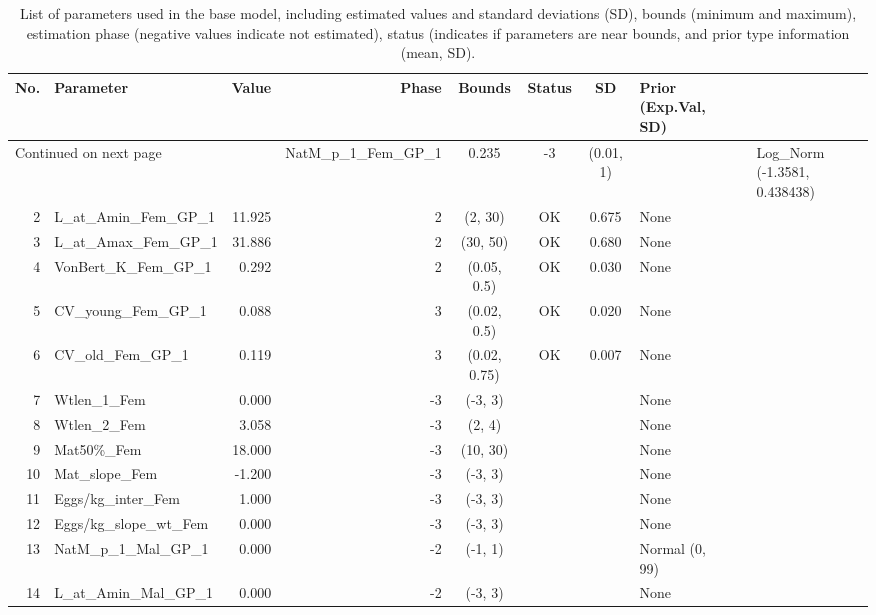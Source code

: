 \documentclass[12pt,]{article}
\begin{document}
\begin{landscape}
\begin{longtable}{rlrrcccl}
\caption{List of parameters used in
                                              the base model, including estimated 
                                              values and standard deviations (SD), 
                                              bounds (minimum and maximum), 
                                              estimation phase (negative values indicate
                                              not estimated), status (indicates if 
                                              parameters are near bounds, and prior type
                                              information (mean, SD).} \\ 
  \hline
No. & Parameter & Value & Phase & Bounds & Status & SD & Prior (Exp.Val, SD)  \\ 
  \hline 
\endhead 
\hline 
\multicolumn{3}{l}{\footnotesize Continued on next page} 
\endfoot 
\endlastfoot 
 \hline
1 & NatM\_p\_1\_Fem\_GP\_1 & 0.235 & -3 & (0.01, 1) &  &  & Log\_Norm (-1.3581, 0.438438) \\ 
  2 & L\_at\_Amin\_Fem\_GP\_1 & 11.925 & 2 & (2, 30) & OK & 0.675 & None \\ 
  3 & L\_at\_Amax\_Fem\_GP\_1 & 31.886 & 2 & (30, 50) & OK & 0.680 & None \\ 
  4 & VonBert\_K\_Fem\_GP\_1 & 0.292 & 2 & (0.05, 0.5) & OK & 0.030 & None \\ 
  5 & CV\_young\_Fem\_GP\_1 & 0.088 & 3 & (0.02, 0.5) & OK & 0.020 & None \\ 
  6 & CV\_old\_Fem\_GP\_1 & 0.119 & 3 & (0.02, 0.75) & OK & 0.007 & None \\ 
  7 & Wtlen\_1\_Fem & 0.000 & -3 & (-3, 3) &  &  & None \\ 
  8 & Wtlen\_2\_Fem & 3.058 & -3 & (2, 4) &  &  & None \\ 
  9 & Mat50\%\_Fem & 18.000 & -3 & (10, 30) &  &  & None \\ 
  10 & Mat\_slope\_Fem & -1.200 & -3 & (-3, 3) &  &  & None \\ 
  11 & Eggs/kg\_inter\_Fem & 1.000 & -3 & (-3, 3) &  &  & None \\ 
  12 & Eggs/kg\_slope\_wt\_Fem & 0.000 & -3 & (-3, 3) &  &  & None \\ 
  13 & NatM\_p\_1\_Mal\_GP\_1 & 0.000 & -2 & (-1, 1) &  &  & Normal (0, 99) \\ 
  14 & L\_at\_Amin\_Mal\_GP\_1 & 0.000 & -2 & (-3, 3) &  &  & None \\ 

\end{longtable}
\end{landscape}
\end{document}
